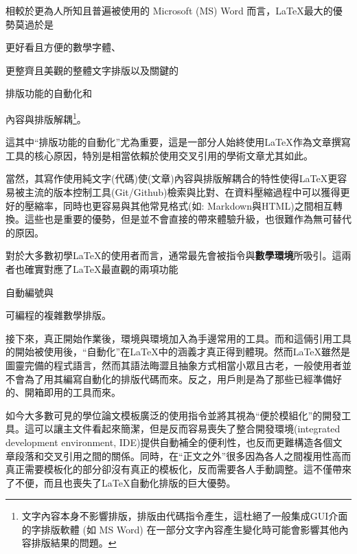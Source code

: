 \documentclass[12pt]{report}
\theoremstyle{plain}
\begin{document}
相較於更為人所知且普遍被使用的 Microsoft (MS) Word 而言，\LaTeX{}最大的優勢莫過於是
\begin{enumerate*}
    \item 更好看且方便的數學字體、
    \item 更整齊且美觀的整體文字排版以及關鍵的
    \item 排版功能的自動化和
    \item 內容與排版解耦\footnote{文字內容本身不影響排版，排版由代碼指令產生，這杜絕了一般集成GUI介面的字排版軟體 (如 MS Word) 在一部分文字內容產生變化時可能會影響其他內容排版結果的問題。}。
\end{enumerate*}
這其中``排版功能的自動化''尤為重要，這是一部分人始終使用\LaTeX{}作為文章撰寫工具的核心原因，特別是相當依賴於使用交叉引用的學術文章尤其如此。

當然，其寫作使用純文字(代碼)使(文章)內容與排版解耦合的特性使得\LaTeX{}更容易被主流的版本控制工具(Git/Github)檢索與比對、在資料壓縮過程中可以獲得更好的壓縮率，同時也更容易與其他常見格式(如: Markdown與HTML)之間相互轉換。這些也是重要的優勢，但是並不會直接的帶來體驗升級，也很難作為無可替代的原因。

對於大多數初學\LaTeX 的使用者而言，通常最先會被指令與\textbf{數學環境}所吸引。這兩者也確實對應了\LaTeX{}最直觀的兩項功能
\begin{enumerate*}
    \item 自動編號與
    \item 可編程的複雜數學排版。
\end{enumerate*}
接下來，真正開始作業後，環境與環境加入為手邊常用的工具。而和這倆引用工具的開始被使用後，``自動化''在\LaTeX{}中的涵義才真正得到體現。然而\LaTeX{}雖然是圖靈完備的程式語言，然而其語法晦澀且抽象方式相當小眾且古老，一般使用者並不會為了用其編寫自動化的排版代碼而來。反之，用戶則是為了那些已經準備好的、開箱即用的工具而來。

如今大多數可見的學位論文模板廣泛的使用指令並將其視為``便於模組化''的開發工具。這可以讓主文件看起來簡潔，但是反而容易喪失了整合開發環境(integrated development environment, IDE)提供自動補全的便利性，也反而更難構造各個文章段落和交叉引用之間的關係。同時，在``正文之外''很多因為各人之間複用性高而真正需要模板化的部分卻沒有真正的模板化，反而需要各人手動調整。這不僅帶來了不便，而且也喪失了\LaTeX 自動化排版的巨大優勢。
\end{document}
